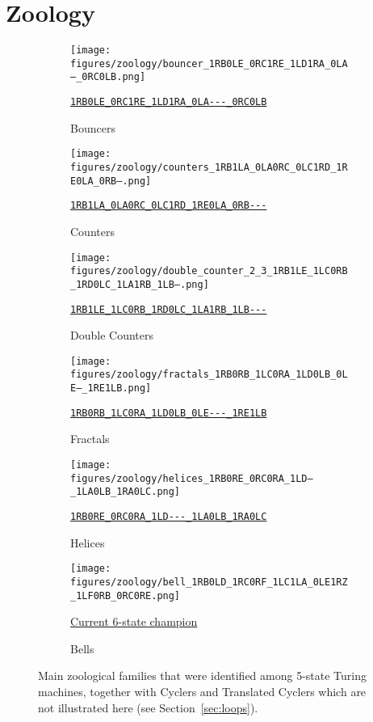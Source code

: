 \documentclass[a4paper,british]{article}
\theoremstyle{definition} %
\numberwithin{equation}{section}
\theoremstyle{definition} %
\newcommand{\tm}[1]{\href{https://bbchallenge.org/#1}{\texttt{\nolinkurl{#1}}}}
\begin{document}
\newpage
\section{Zoology}\label{sec:zoo}
\vspace{-1em}
\begin{figure}[htbp]
    \centering

    \begin{subfigure}{0.3\textwidth}
        \centering
        \texttt{[image: figures/zoology/bouncer\_1RB0LE\_0RC1RE\_1LD1RA\_0LA---\_0RC0LB.png]}
        \caption*{Bouncers}
        {\scriptsize \tm{1RB0LE_0RC1RE_1LD1RA_0LA---_0RC0LB}}
    \end{subfigure}
    \hfill
    \begin{subfigure}{0.3\textwidth}
        \centering
        \texttt{[image: figures/zoology/counters\_1RB1LA\_0LA0RC\_0LC1RD\_1RE0LA\_0RB---.png]}
        \caption*{Counters}
        {\scriptsize \tm{1RB1LA_0LA0RC_0LC1RD_1RE0LA_0RB---}}
    \end{subfigure}
    \hfill
    \begin{subfigure}{0.3\textwidth}
        \centering
        \texttt{[image: figures/zoology/double\_counter\_2\_3\_1RB1LE\_1LC0RB\_1RD0LC\_1LA1RB\_1LB---.png]}
        \caption*{Double Counters}
        {\scriptsize \tm{1RB1LE_1LC0RB_1RD0LC_1LA1RB_1LB---}}
    \end{subfigure}

    \vspace{0.5cm}

    \begin{subfigure}{0.3\textwidth}
        \centering
        \texttt{[image: figures/zoology/fractals\_1RB0RB\_1LC0RA\_1LD0LB\_0LE---\_1RE1LB.png]}
        \caption*{Fractals}
        {\scriptsize \tm{1RB0RB_1LC0RA_1LD0LB_0LE---_1RE1LB}}
    \end{subfigure}
    \hfill
    \begin{subfigure}{0.3\textwidth}
        \centering
        \texttt{[image: figures/zoology/helices\_1RB0RE\_0RC0RA\_1LD---\_1LA0LB\_1RA0LC.png]}
        \caption*{Helices}
        {\scriptsize \tm{1RB0RE_0RC0RA_1LD---_1LA0LB_1RA0LC}}
    \end{subfigure}
    \hfill
    \begin{subfigure}{0.3\textwidth}
        \centering
        \texttt{[image: figures/zoology/bell\_1RB0LD\_1RC0RF\_1LC1LA\_0LE1RZ\_1LF0RB\_0RC0RE.png]}
        \caption*{Bells}
        {\scriptsize \href{https://bbchallenge.org/1RB0LD_1RC0RF_1LC1LA_0LE1RZ_1LF0RB_0RC0RE}{Current 6-state champion \cite{Pavel_discorvery}}}
    \end{subfigure}

    \caption{Main zoological families that were identified among 5-state Turing machines, together with Cyclers and Translated Cyclers which are not illustrated here (see Section~\ref{sec:loops}). }
    \label{fig:zoology}
\end{figure}
\end{document}
